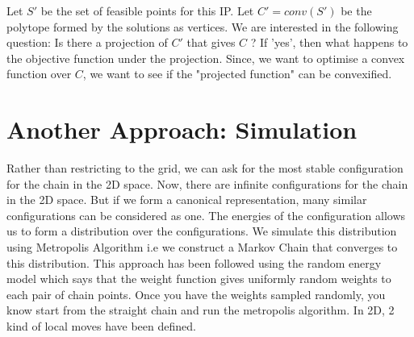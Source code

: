\documentclass[12pt]{article}
\theoremstyle{definition}
\theoremstyle{remark}
\begin{document}
Let $S'$ be the set of feasible points for this IP. Let $C' = conv(S')$ be the polytope formed by the solutions as vertices. We are interested in the following question:
\newline
\newline
Is there a projection of $C'$ that gives $C$ ? If 'yes', then what happens to the objective function under the projection. 
\newline
\newline
Since, we want to optimise a convex function over $C$, we want to see if the "projected function" can be convexified.

\section{Another Approach: Simulation}

Rather than restricting to the grid, we can ask for the most stable configuration for the chain in the 2D space. Now, there are infinite configurations for the chain in the 2D space. But if we form a canonical representation, many similar configurations can be considered as one. The energies of the configuration allows us to form a distribution over the configurations. We simulate this distribution using Metropolis Algorithm i.e we construct a Markov Chain that converges to this distribution. This approach has been followed using the random energy model which says that the weight function gives uniformly random weights to each pair of chain points. Once you have the weights sampled randomly, you know start from the straight chain and run the metropolis algorithm. In 2D, 2 kind of local moves have been defined.
\end{document}
